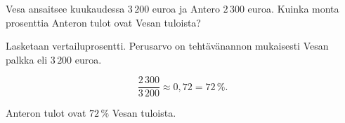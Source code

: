 
\begin{esimerkki}
Vesa ansaitsee kuukaudessa $3\,200$ euroa ja Antero $2\,300$ euroa. Kuinka monta prosenttia Anteron tulot ovat Vesan tuloista? 
    
	\begin{esimratk}
    Lasketaan vertailuprosentti. Perusarvo on tehtävänannon mukaisesti Vesan palkka eli $3\,200$ euroa.
    
    \[
        \frac{2\,300}{3\,200} 
        \approx 0,72
        = 72\,\%.
    \]
    \end{esimratk}
    
  \begin{esimvast}
Anteron tulot ovat $72\,\%$ Vesan tuloista.
  \end{esimvast}
\end{esimerkki}


